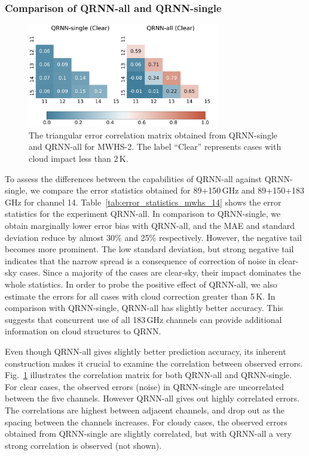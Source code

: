 \documentclass[amt, manuscript]{copernicus}
\begin{document}
\subsubsection{Comparison of QRNN-all and QRNN-single}
%
\begin{figure}[t]
	\centering
	\includegraphics[height=45mm]{Figures/correlation.pdf} 
	\caption{ The triangular error correlation matrix obtained from QRNN-single and QRNN-all for MWHS-2. The label ``Clear'' represents cases with cloud impact less than 2\,K.}
	\label{fig:correlations_mwhs}	
\end{figure}
To assess the differences between the capabilities of QRNN-all against QRNN-single, we  compare the error statistics obtained for 89+150\,GHz and 89+150+183\,GHz for channel 14.  Table~\ref{tab:error_statistics_mwhs_14} shows the error statistics for the experiment QRNN-all. In comparison to QRNN-single, we obtain marginally lower error bias with QRNN-all, and the MAE and standard deviation reduce by almost 30\% and 25\% respectively. However, the negative tail becomes more prominent. The low standard deviation, but strong negative tail indicates that the narrow spread is a consequence of correction of noise in clear-sky cases. Since a majority of the cases are clear-sky, their impact dominates the whole statistics. In order to probe the positive effect of QRNN-all, we also estimate the errors for all cases with cloud correction greater than 5\,K. In comparison with QRNN-single, QRNN-all has slightly better accuracy. This suggests that concurrent use of all 183\,GHz channels can provide additional information on cloud structures to QRNN. 

Even though QRNN-all gives slightly better prediction accuracy, its inherent construction makes it crucial to examine the correlation between observed errors. Fig.~\ref{fig:correlations_mwhs} illustrates the correlation matrix for both QRNN-all and QRNN-single. For clear cases, the observed errors (noise) in QRNN-single are uncorrelated between the five channels. However QRNN-all gives out highly correlated errors. The correlations are highest between adjacent channels, and drop out as the spacing between the channels increases. For cloudy cases, the observed errors obtained from QRNN-single are slightly correlated, but with QRNN-all a very strong correlation is observed (not shown). 
\end{document}
